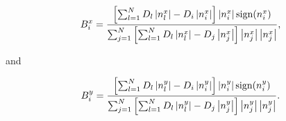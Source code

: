 \begin{equation}
\label{bx2}
B_i^x =  \frac{\left [ \sum_{l=1}^N D_l  \left | n_l^x \right |  - D_i \left | n_i^x \right |  \right ] \left | n_i^x \right | \text{sign} (n_i^x)  }{\sum_{j=1}^N \left [ \sum_{l=1}^N D_l  \left | n_l^x \right |  - D_j \left | n_j^x \right | \right ] \left | n_j^x \right |  \left | n_j^x \right | } ,
\end{equation}

and

\begin{equation}
\label{bx2}
B_i^y =  \frac{\left [ \sum_{l=1}^N D_l  \left | n_l^y \right |  - D_i \left | n_i^y \right |  \right ] \left | n_i^y \right | \text{sign} (n_i^y)  }{\sum_{j=1}^N \left [ \sum_{l=1}^N D_l  \left | n_l^y \right |  - D_j \left | n_j^y \right | \right ] \left | n_j^y \right |  \left | n_j^y \right | } .
\end{equation}


